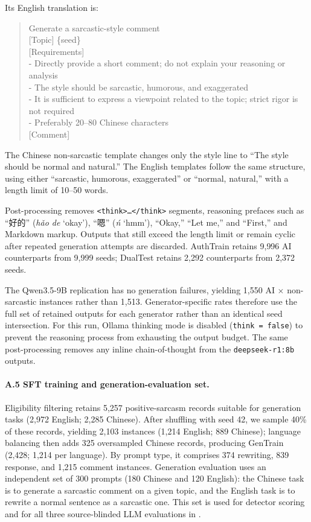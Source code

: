 Its English translation is:

\begin{quote}\small\ttfamily
[Task] Generate a sarcastic-style comment\\
{[Topic]} \{seed\}\\
{[Requirements]}\\
- Directly provide a short comment; do not explain your reasoning or analysis\\
- The style should be sarcastic, humorous, and exaggerated\\
- It is sufficient to express a viewpoint related to the topic; strict rigor is not required\\
- Preferably 20--80 Chinese characters\\
{[Comment]}
\end{quote}

The Chinese non-sarcastic template changes only the style line to ``The style should be normal and natural.'' The English templates follow the same structure, using either ``sarcastic, humorous, exaggerated'' or ``normal, natural,'' with a length limit of 10--50 words.

Post-processing removes \texttt{<think>\dots</think>} segments, reasoning prefaces such as ``好的'' (\textit{hǎo de} `okay'), ``嗯'' (\textit{ń} `hmm'), ``Okay,'' ``Let me,'' and ``First,'' and Markdown markup. Outputs that still exceed the length limit or remain cyclic after repeated generation attempts are discarded. AuthTrain retains 9{,}996 AI counterparts from 9{,}999 seeds; DualTest retains 2{,}292 counterparts from 2{,}372 seeds.

The Qwen3.5-9B replication has no generation failures, yielding 1{,}550 AI $\times$ non-sarcastic instances rather than 1{,}513. Generator-specific rates therefore use the full set of retained outputs for each generator rather than an identical seed intersection. For this run, Ollama thinking mode is disabled (\texttt{think = false}) to prevent the reasoning process from exhausting the output budget. The same post-processing removes any inline chain-of-thought from the \texttt{deepseek-r1:8b} outputs.

\paragraph{A.5 SFT training and generation-evaluation set.} Eligibility filtering retains 5{,}257 positive-sarcasm records suitable for generation tasks (2{,}972 English; 2{,}285 Chinese). After shuffling with seed 42, we sample 40\% of these records, yielding 2{,}103 instances (1{,}214 English; 889 Chinese); language balancing then adds 325 oversampled Chinese records, producing GenTrain (2{,}428; 1{,}214 per language). By prompt type, it comprises 374 rewriting, 839 response, and 1{,}215 comment instances. Generation evaluation uses an independent set of 300 prompts (180 Chinese and 120 English): the Chinese task is to generate a sarcastic comment on a given topic, and the English task is to rewrite a normal sentence as a sarcastic one. This set is used for detector scoring and for all three source-blinded LLM evaluations in .

